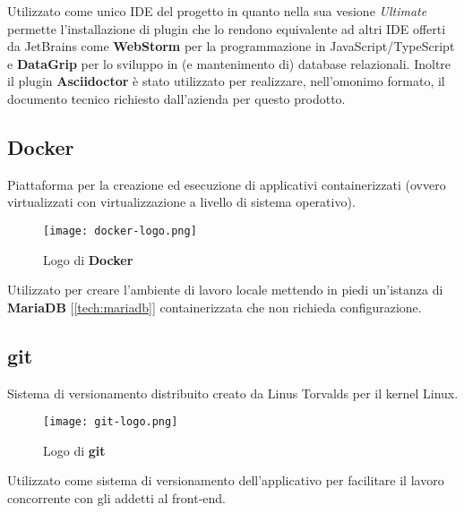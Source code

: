     Utilizzato come unico IDE del progetto in quanto nella sua vesione \textit{Ultimate} permette l'installazione di plugin che lo rendono equivalente ad altri IDE offerti da JetBrains come \textbf{WebStorm} per la programmazione in JavaScript/TypeScript e \textbf{DataGrip} per lo sviluppo in (e mantenimento di) database relazionali. Inoltre il plugin \textbf{Asciidoctor} è stato utilizzato per realizzare, nell'omonimo formato, il documento tecnico richiesto dall'azienda per questo prodotto.

    \subsection{Docker}
    Piattaforma per la creazione ed esecuzione di applicativi containerizzati (ovvero virtualizzati con virtualizzazione a livello di sistema operativo).

    \begin{figure}[h!]
        \centering
        \texttt{[image: docker-logo.png]}
        \caption{Logo di \textbf{Docker}}
    \end{figure}

    Utilizzato per creare l'ambiente di lavoro locale mettendo in piedi un'istanza di \textbf{MariaDB} [\autoref{tech:mariadb}] containerizzata che non richieda configurazione.

    \subsection{git}
    Sistema di versionamento distribuito creato da Linus Torvalds per il kernel Linux.

    \begin{figure}[h!]
        \centering
        \texttt{[image: git-logo.png]}
        \caption{Logo di \textbf{git}}
    \end{figure}

    Utilizzato come sistema di versionamento dell'applicativo per facilitare il lavoro concorrente con gli addetti al front-end.
